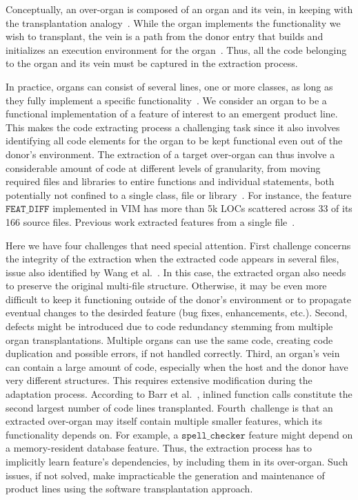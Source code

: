 Conceptually, an over-organ is composed of an organ and its vein, in keeping with the transplantation analogy~\cite{Barr2015}. While the organ implements the functionality we wish to transplant, the vein is a path from the donor entry that builds and initializes an execution environment for the organ~\cite{Barr2015}. Thus, all the code belonging to the organ and its vein must be captured in the extraction process.

In practice, organs can consist of several lines, one or more classes, as long as they fully implement a specific functionality~\cite{Wang2018}. We consider an organ to be a functional implementation of a feature of interest to an emergent product line. 
This makes the code extracting process a challenging task since it also involves identifying all code elements for the organ to be kept functional even out of the donor's environment.
The extraction of a target over-organ can thus involve a considerable amount of code at different levels of granularity, from moving required files and libraries to entire functions and individual statements, both potentially not confined to a single class, file or library~\cite{Wang2018}. For instance, the feature $\texttt{FEAT\_DIFF}$ implemented in VIM has more than 5k LOCs scattered across 33 of its 166 source files. 
Previous work extracted features from a single file~\cite{Barr2015}.

Here we have four challenges that need special attention. 
First challenge concerns the integrity of the extraction when the extracted code appears in several files, issue also identified by Wang et al.~\cite{Wang2018}. 
In this case, the extracted organ also needs to preserve the original multi-file structure. 
Otherwise, it may be even more difficult to keep it functioning outside of  the donor's environment or to propagate eventual changes to the desirded feature (bug fixes, enhancements, etc.).
Second, defects might be introduced due to code redundancy stemming from multiple organ transplantations. 
Multiple organs can use the same code, creating code duplication and possible errors, if not handled correctly.
Third, an organ's vein can contain a large amount of code, especially when the host and the donor have very different structures. 
This requires extensive modification during the adaptation process. 
According to Barr et al.~\cite{Barr2015},  inlined function calls constitute the second largest number of code lines transplanted. 
Fourth challenge is that an extracted over-organ may itself contain multiple smaller features, which its functionality depends on.
For example, a $\texttt{spell\_checker}$ feature might depend on a memory-resident database feature. 
Thus, the extraction process has to implicitly learn feature's dependencies, by including them in its over-organ. 
Such issues, if not solved, make impracticable the generation and maintenance of product lines using the software transplantation approach. 

